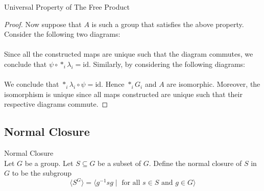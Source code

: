 \documentclass[a4paper]{article}
\begin{document}
\begin{prp}{Universal Property of The Free Product}{}
\begin{proof}
Now suppose that $A$ is such a group that satisfies the above property. Consider the following two diagrams: \\
 \\
Since all the constructed maps are unique such that the diagram commutes, we conclude that $\psi\circ\ast_i\lambda_i=\text{id}$. Similarly, by considering the following diagrams: \\
 \\
We conclude that $\ast_i\lambda_i\circ\psi=\text{id}$. Hence $\ast_iG_i$ and $A$ are isomorphic. Moreover, the isomorphism is unique since all maps constructed are unique such that their respective diagrams commute. 
\end{proof}
\end{prp}

\subsection{Normal Closure}
\begin{defn}{Normal Closure}{}\\
Let $G$ be a group. Let $S\subseteq G$ be a subset of $G$. Define the normal closure of $S$ in $G$ to be the subgroup $$\langle S^G\rangle=\langle g^{-1}sg\;|\;\text{ for all }s\in S\text{ and }g\in G\rangle$$
\end{defn}
\end{document}
